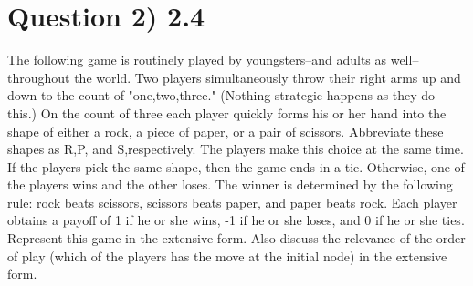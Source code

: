\documentclass{article}
\begin{document}
\section*{Question 2) 2.4}
The following game is routinely played by youngsters--and adults as well--throughout the world.
Two players simultaneously throw their right arms up and down to the count of "one,two,three."
(Nothing strategic happens as they do this.)
On the count of three each player quickly forms his or her hand into the shape of either a rock, a piece of paper, or a pair of scissors.
Abbreviate these shapes as R,P, and S,respectively.
The players make this choice at the same time.
If the players pick the same shape, then the game ends in a tie. Otherwise, one of the players wins and the other loses.
The winner is determined by the following rule: rock beats scissors, scissors beats paper, and paper beats rock.
Each player obtains a payoff of 1 if he or she wins, -1 if he or she loses, and 0 if he or she ties.
Represent this game in the extensive form.
Also discuss the relevance of the order of play (which of the players has the move at the initial node) in the extensive form.
\\
\end{document}
